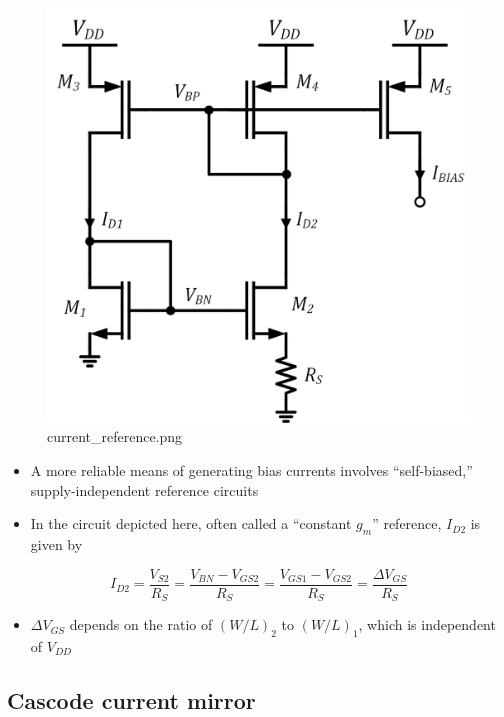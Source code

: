 \documentclass[11pt]{article}
\providecommand{\tightlist}{%
      \setlength{\itemsep}{0pt}\setlength{\parskip}{0pt}}
\begin{document}
    \begin{figure}
\centering
\includegraphics{current_reference.png}
\caption{current\_reference.png}
\end{figure}

    \begin{itemize}
\item
  A more reliable means of generating bias currents involves
  ``self-biased,'' supply-independent reference circuits
\item
  In the circuit depicted here, often called a ``constant \(g_m\)''
  reference, \(I_{D2}\) is given by
\end{itemize}

\begin{equation}
I_{D2} = \dfrac{V_{S2}}{R_S} = \dfrac{V_{BN}-V_{GS2}}{R_S} = \dfrac{V_{GS1}-V_{GS2}}{R_S} = \dfrac{\Delta V_{GS}}{R_S}
\end{equation}

\begin{itemize}
\tightlist
\item
  \(\Delta V_{GS}\) depends on the ratio of \((W/L)_2\) to \((W/L)_1\),
  which is independent of \(V_{DD}\)
\end{itemize}

    \hypertarget{cascode-current-mirror}{%
\subsection{Cascode current mirror}\label{cascode-current-mirror}}
\end{document}
